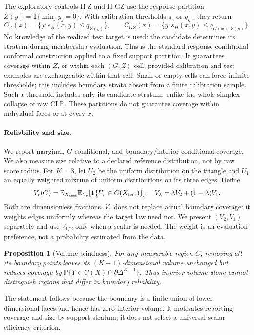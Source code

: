 \documentclass{article}
\newtheorem{proposition}{Proposition}
\newcommand{\D}{\Delta^{K-1}}
\newcommand{\Pp}{\mathbb P}
\newcommand{\E}{\mathbb E}
\newcommand{\ind}{\mathbf 1}
\begin{document}
The exploratory controls H-Z and H-GZ use the response partition $Z(y)=\ind\{\min_j y_j=0\}$. With calibration thresholds $q_z$ or $q_{g,z}$ they return
\begin{equation}
 C_Z(x)=\{y:s_H(x,y)\le q_{Z(y)}\},\qquad
 C_{GZ}(x)=\{y:s_H(x,y)\le q_{G(x),Z(y)}\}.
 \label{eq:response}
\end{equation}
No knowledge of the realized test target is used: the candidate determines its stratum during membership evaluation. This is the standard response-conditional conformal construction applied to a fixed support partition. It guarantees coverage within $Z$, or within each $(G,Z)$ cell, provided calibration and test examples are exchangeable within that cell. Small or empty cells can force infinite thresholds; this includes boundary strata absent from a finite calibration sample. Such a threshold includes only its candidate stratum, unlike the whole-simplex collapse of raw CLR. These partitions do not guarantee coverage within individual faces or at every $x$.

\paragraph{Reliability and size.}
We report marginal, $G$-conditional, and boundary/interior-conditional coverage. We also measure size relative to a declared reference distribution, not by raw score radius. For $K=3$, let $U_2$ be the uniform distribution on the triangle and $U_1$ an equally weighted mixture of uniform distributions on its three edges. Define
\begin{equation}
 V_r(C)=\E_{X_{\rm test}}\E_{U_r}[\ind\{U_r\in C(X_{\rm test})\}],\quad
 V_\lambda=\lambda V_2+(1-\lambda)V_1.
 \label{eq:size}
\end{equation}
Both are dimensionless fractions. $V_1$ does not replace actual boundary coverage: it weights edges uniformly whereas the target law need not. We present $(V_2,V_1)$ separately and use $V_{1/2}$ only when a scalar is needed. The weight is an evaluation preference, not a probability estimated from the data.

\begin{proposition}[Volume blindness]
For any measurable region $C$, removing all its boundary points leaves its $(K-1)$-dimensional volume unchanged but reduces coverage by $\Pp\{Y\in C(X)\cap\partial\D\}$. Thus interior volume alone cannot distinguish regions that differ in boundary reliability.
\label{prop:blind}
\end{proposition}
The statement follows because the boundary is a finite union of lower-dimensional faces and hence has zero interior volume. It motivates reporting coverage and size by support stratum; it does not select a universal scalar efficiency criterion.
\end{document}
